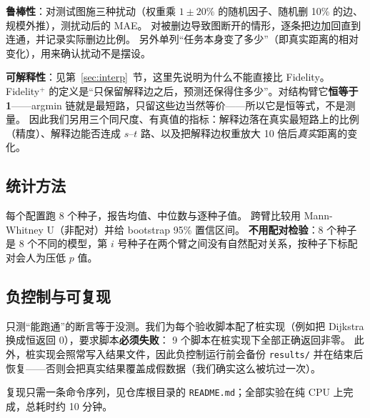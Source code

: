 \textbf{鲁棒性}：对测试图施三种扰动（权重乘 $1\pm20\%$ 的随机因子、随机删 10\% 的边、规模外推），测扰动后的 MAE。
对被删边导致图断开的情形，逐条把边加回直到连通，并记录实际删边比例。
另外单列“任务本身变了多少”（即真实距离的相对变化），用来确认扰动不是摆设。

\textbf{可解释性}：见第~\ref{sec:interp}~节，这里先说明为什么不能直接比 Fidelity。
Fidelity$^+$ 的定义是“只保留解释边之后，预测还保得住多少”。对结构臂它\textbf{恒等于 1}——argmin 链就是最短路，只留这些边当然等价——所以它是恒等式，不是测量。
因此我们另用三个同尺度、有真值的指标：解释边落在真实最短路上的比例（精度）、解释边能否连成 $s$--$t$ 路、以及把解释边权重放大 10 倍后\emph{真实}距离的变化。

\subsection{统计方法}

每个配置跑 8 个种子，报告均值、中位数与逐种子值。
跨臂比较用 Mann-Whitney U（非配对）并给 bootstrap 95\% 置信区间。
\textbf{不用配对检验}：8 个种子是 8 个不同的模型，第 $i$ 号种子在两个臂之间没有自然配对关系，按种子下标配对会人为压低 $p$ 值。

\subsection{负控制与可复现}

只测“能跑通”的断言等于没测。我们为每个验收脚本配了桩实现（例如把 Dijkstra 换成恒返回 0），要求脚本\textbf{必须失败}：
9 个脚本在桩实现下全部正确返回非零。
此外，桩实现会照常写入结果文件，因此负控制运行前会备份 \texttt{results/} 并在结束后恢复——否则会把真实结果覆盖成假数据（我们确实这么被坑过一次）。

复现只需一条命令序列，见仓库根目录的 \texttt{README.md}；全部实验在纯 CPU 上完成，总耗时约 10 分钟。
